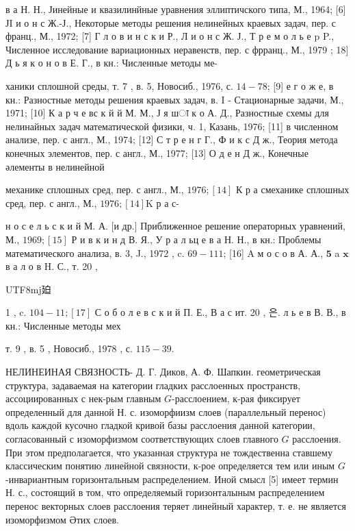 \documentclass[10pt]{article}
\begin{document}
в а Н. Н., Јинейные и квазилинйные уравнения эллиптичского типа, М., 1964; [6] ЈI и о н с Ж.-Ј., Некоторые методы решения нелинейных краевых задач, пер. с франц., М., 1972; [7] Г л о в и н с к и Р., Л и о н с Ж. Ј., Т р е м о л ь е p P., Численное исследование вариационных неравенств, пер. с фрранц., М., 1979 ; 18$]$ Д ь я к о н о в Е. Г., в кн.: Численные методы ме-

ханики сплошной среды, т. 7 , в. 5, Новосиб., 1976, с. $14-78$; [9] е г о ж е, в кн.: Разностные методы решения краевых задач, в. I - Стационарные задачи, М., 1971; [10] К а р ч е вс к й й М. М., Ј я шा к о А. Д., Разностные схемы для нелинайных задач математической физики, ч. 1, Казань, 1976; [11] в численном анализе, пер. с англ., М., 1974; [12] С т р е н г Г., Ф и к с Д ж., Теория метода конечных элементов, пер. с англ., М., 1977; [13] О д е н Д ж., Конечные әлементы в нелинейной

механике сплошных сред, пер. с англ., М., $1976 ;[14]$ К р а смеханике сплошных сред, пер. с англ., М., $1976 ;[14] \mathrm{K}$ р а с-

н о с е л ь с к и й М. А. [и др.] Приближенное решение операторных уравнений, М., $1969 ;[15]$ Р и в к и н д В. Я., У р а л ьц е в а Н. Н., в кн.: Проблемы математического анализа, в. 3, J., 1972 , c. $69-111$; [16] A м о с о в А. А., $\mathbf{5}$ a $\mathbf{x}$ в а л о в H. С., т. 20 , \begin{CJK}{UTF8}{mj}廹\end{CJK} 1 , c. $104-11 ;[17]$ С о б о л е в с к и й П. Е., В а с ит. 20 , 은. л ь е в В. В., в кн.: Численные методы мех

т. 9 , в. 5 , Новосиб., 1978 , с. $115-39$.



НЕЛИНЕИНАЯ СВЯЗНОСТЬ- Д. Г. Диков, А. Ф. Шапкин. геометрическая структура, задаваемая на категории гладких расслоенных пространств, ассоциированных с нек-рым главным $G$-расслоением, к-рая фиксирует определенный для данной Н. с. изоморфиизм слоев (параллельный перенос) вдоль каждой кусочно гладкой кривой базы расслоения данной категории, согласованный с изоморфизмом соответствующих слоев главного $G$ расслоения. При этом предполагается, что указанная структура не тождественна ставшему классическим понятию линейной связности, к-рое определяется тем или иным $G$-инвариантным горизонтальным распределением. Иной смысл [5] имеет термин Н. с., состоящий в том, что определяемый горизонталыным распределением перенос векторных слоев расслоения теряет линейный характер, т. е. не является изоморфизмом Әтих слоев.
\end{document}
